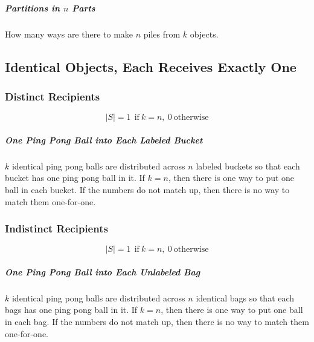 \subparagraph{Partitions in $n$ Parts} How many ways are there to make $n$ piles from $k$ objects.



\subsection{Identical Objects, Each Receives Exactly One}

\subsubsection{Distinct Recipients}

\begin{equation}
|S| = 1\ \ \mathrm{if\ }k = n,\ 0\ \mathrm{otherwise}
\end{equation}  

\subparagraph{One Ping Pong Ball into Each Labeled Bucket} $k$ identical ping pong balls are distributed across $n$ labeled buckets so that each bucket has one ping pong ball in it. If $k=n$, then there is one way to put one ball in each bucket. If the numbers do not match up, then there is no way to match them one-for-one.

\subsubsection{Indistinct Recipients}

\begin{equation}
|S| = 1\ \ \mathrm{if\ }k = n,\ 0\ \mathrm{otherwise}
\end{equation}  

\subparagraph{One Ping Pong Ball into Each Unlabeled Bag} $k$ identical ping pong balls are distributed across $n$ identical bags so that each bags has one ping pong ball in it. If $k=n$, then there is one way to put one ball in each bag. If the numbers do not match up, then there is no way to match them one-for-one.




